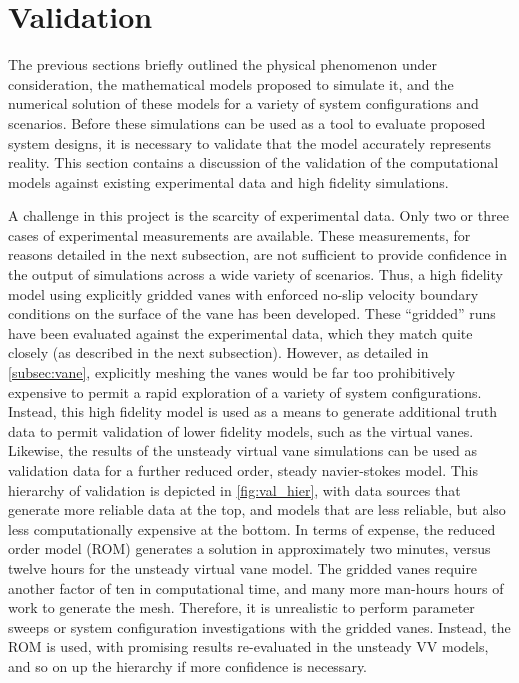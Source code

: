 
\section{Validation}
\label{sec:validation}

%
%
%

%
%

The previous sections briefly outlined the physical phenomenon under
consideration, the mathematical models proposed to simulate it,
and the numerical solution of these models for a variety of system 
configurations and scenarios. Before these simulations can be used 
as a tool to evaluate proposed system designs,
it is necessary to validate that the model accurately represents reality.  
This section contains a discussion of the validation of the computational models
against existing experimental data and high fidelity simulations.

A challenge in this project is the scarcity of experimental data. Only two or three cases of 
experimental measurements are available. These measurements, for reasons detailed in the next 
subsection, are not sufficient to provide confidence in the output of simulations across a wide variety 
of scenarios. Thus, a high fidelity model using explicitly gridded vanes with enforced no-slip 
velocity boundary conditions on the surface of the vane has been developed. These ``gridded'' runs 
have been evaluated against the experimental data, which they match quite closely 
(as described in the next subsection). However, as 
detailed in \ref{subsec:vane}, explicitly meshing the vanes would be far too prohibitively expensive to 
permit a rapid exploration of a variety of system configurations. Instead, this high fidelity model 
is used as a means to generate additional truth data to permit validation of lower fidelity 
models, such as the virtual vanes. Likewise, the results of the unsteady virtual vane simulations 
can be used as validation data for a further reduced order, steady navier-stokes model. This 
hierarchy of validation is depicted in \ref{fig:val_hier}, with data sources that generate more 
reliable data at the top, and models that are less reliable, but also 
less computationally expensive at the bottom. In terms of expense, the reduced order model (ROM) 
generates a solution in approximately two minutes, versus twelve hours for the unsteady virtual vane 
model. The gridded vanes require another factor of ten in computational time, and many more 
man-hours hours of work to generate the mesh. Therefore, it is unrealistic to perform parameter 
sweeps or system configuration investigations with the gridded vanes. Instead, the ROM is used, 
with promising results re-evaluated in the unsteady VV models, and so on up the hierarchy if 
more confidence is necessary. 

